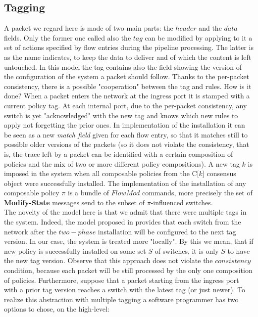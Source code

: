 \documentclass{article}
\theoremstyle{remark}
\begin{document}
\subsection{Tagging}
A packet we regard here is made of two main parts: the $header$ and the $data$ fields. Only the former one called also the $tag$ can be modified by applying to it a set of actions specified by flow entries during the pipeline processing. The latter is as the name indicates, to keep the data to deliver and of which the content is left untouched.
In this model the tag contains also the field showing the version of the configuration of the system a packet should follow. Thanks to the per-packet consistency, there is a possible "cooperation" between the tag and rules.
How is it done? When a packet enters the network at the ingress port it is stamped with a current policy tag. At each internal port, due to the per-packet consistency, any switch is yet "acknowledged" with the new tag and knows which new rules to apply not forgetting the prior ones. In implementation of the installation it can be seen as a new \emph{match field} given for each flow entry, so that it matches still to possible older versions of the packets (so it does not violate the consistency, that is, the trace left by a packet can be identified with a certain composition of policies and the mix of two or more different policy compositions). 
A new tag $k$ is imposed in the system when all composable policies from the C[$k$] consensus object were successfully installed.
The implementation of the installation of any composable policy $\pi$ is a bundle of $FlowMod$ commands, more precisely the set of \textbf{Modify-State} messages send to the subset of $\pi$-influenced switches. \\
The novelty of the model here is that we admit that there were multiple tags in the system. Indeed, the model proposed in \cite{Reitblatt:2012:ANU:2342356.2342427} provides that each switch from the network after the $two-phase$ installation will be configured to the next tag version. In our case, the system is treated more "locally". By this we mean, that if new policy is successfully installed on some set $S$ of switches, it is only $S$ to have the new tag version. Observe that this approach does not violate the $consistency$ condition, because each packet will be still processed by the only one composition of policies. Furthermore, suppose that a packet starting from the ingress port with a prior tag version reaches a switch with the latest tag (or just newer). To realize this abstraction with multiple tagging a software programmer has two options to chose, on the high-level:
\end{document}
